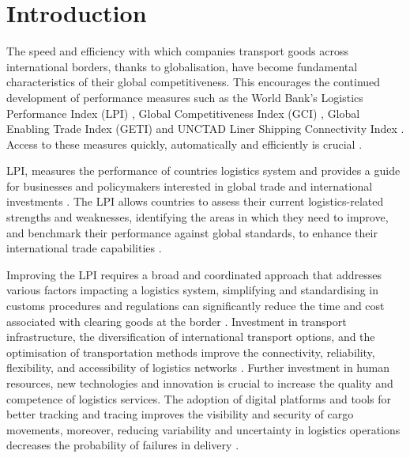 \documentclass[conference]{IEEEtran}
\begin{document}
\section{Introduction}
The speed and efficiency with which companies transport goods across international borders, thanks to globalisation, have become fundamental characteristics of their global competitiveness. This encourages the continued development of performance measures such as the
 World Bank’s Logistics Performance Index (LPI) \cite{beysenbaev2020}, Global Competitiveness Index (GCI) \cite{wef2020}, Global Enabling Trade Index (GETI) \cite{wef2018} and UNCTAD Liner Shipping Connectivity Index \cite{unctad2020}. Access to these measures quickly, automatically and efficiently is crucial \cite{babayigit2023, shepherd2023}. 


LPI, measures the performance of countries logistics system and provides a guide for businesses and policymakers interested in global trade and international investments \cite{arvis2016,arvis2018,arvis2023,civelek2015}. The LPI allows countries to assess their current logistics-related strengths and weaknesses, identifying the areas in which they need to improve, and benchmark their performance against global standards, to enhance their international trade capabilities \cite{beysenbaev2020,polat2023}.

Improving the LPI requires a broad and coordinated approach that addresses various factors impacting a logistics system, simplifying and standardising in customs procedures and regulations can significantly reduce the time and cost associated with clearing goods at the border \cite{babayigit2023,beysenbaev2020}. Investment in transport infrastructure, the diversification of international transport options, and the optimisation of transportation methods improve the connectivity, reliability, flexibility, and accessibility of logistics networks \cite{marti2014}. Further investment in human resources, new technologies and innovation is crucial to increase the quality and competence of logistics services. The adoption of digital platforms and tools for better tracking and tracing improves the visibility and security of cargo movements, moreover, reducing variability and uncertainty in logistics operations decreases the probability of failures in delivery \cite{WBreport2018}.
\end{document}
